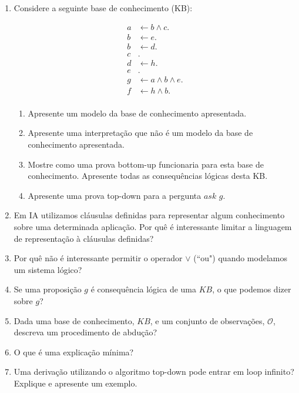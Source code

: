 \documentclass{article}
\begin{document}
\begin{enumerate}
    \item Considere a seguinte base de conhecimento (KB):
    
    \begin{center}
        \begin{align*}
         a & \leftarrow b \wedge c. \\ 
         b & \leftarrow e. \\ 
         b & \leftarrow d. \\ 
         c &. \\ 
         d & \leftarrow h. \\ 
         e &. \\
         g & \leftarrow a \wedge b  \wedge e. \\
         f & \leftarrow h \wedge b. \\  
        \end{align*}
    \end{center}
    

    \begin{enumerate}
        \item Apresente um modelo da base de conhecimento apresentada.
        \item Apresente uma interpretação que não é um modelo da base de conhecimento apresentada.
        \item Mostre como uma prova bottom-up funcionaria para esta base de conhecimento. Apresente todas as consequências lógicas desta KB.
        \item Apresente uma prova top-down para a pergunta $ask$ $g$.
    \end{enumerate}
    
    \item Em IA utilizamos cláusulas definidas para representar algum conhecimento sobre uma determinada aplicação. Por quê é interessante limitar a linguagem de representação à cláusulas definidas?
    
    \item Por quê não é interessante permitir o operador $\vee$ (``ou") quando modelamos um sistema lógico?
    
    \item Se uma proposição $g$ é consequência lógica de uma $KB$, o que podemos dizer sobre $g$?
    
    \item Dada uma base de conhecimento, $KB$, e um conjunto de observações, $\mathcal{O}$, descreva um procedimento de abdução?
    
    \item O que é uma explicação mínima? 
    
    \item Uma derivação utilizando o algoritmo top-down pode entrar em loop infinito? Explique e apresente um exemplo. 
    
\end{enumerate}
   
\end{document}
